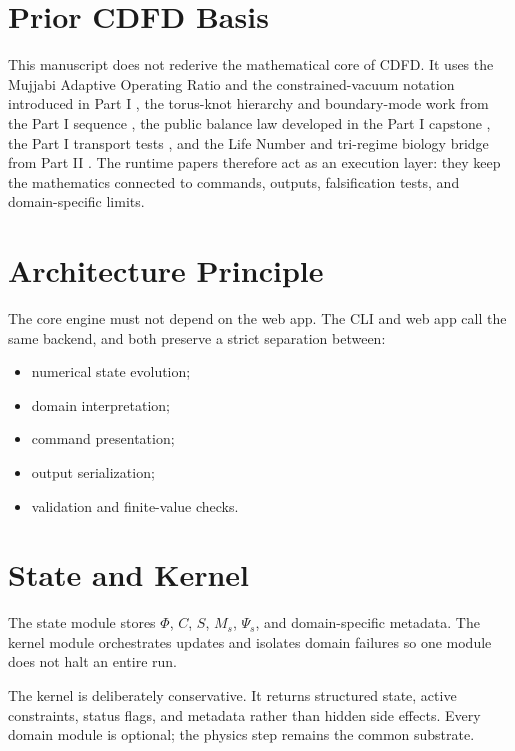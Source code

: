 \documentclass[12pt,a4paper]{article}
\begin{document}
\section{Prior CDFD Basis}
This manuscript does not rederive the mathematical core of CDFD. It uses the
Mujjabi Adaptive Operating Ratio and the constrained-vacuum notation introduced
in Part I \cite{MujjabiI2026}, the torus-knot hierarchy and boundary-mode work
from the Part I sequence \cite{MujjabiVI2026,MujjabiIX2026}, the public balance
law developed in the Part I capstone \cite{MujjabiX2026}, the Part I transport
tests \cite{MujjabiXII2026}, and the Life Number and tri-regime biology bridge
from Part II \cite{MujjabiPartII2026}. The runtime papers therefore act as an
execution layer: they keep the mathematics connected to commands, outputs,
falsification tests, and domain-specific limits.


\section{Architecture Principle}
The core engine must not depend on the web app. The CLI and web app call
the same backend, and both preserve a strict separation between:
\begin{itemize}
    \item numerical state evolution;
    \item domain interpretation;
    \item command presentation;
    \item output serialization;
    \item validation and finite-value checks.
\end{itemize}

\section{State and Kernel}
The state module stores $\Phi$, $C$, $S$, $M_s$, $\Psi_s$, and domain-specific
metadata. The kernel module orchestrates updates and isolates domain failures
so one module does not halt an entire run.

The kernel is deliberately conservative. It returns structured state, active
constraints, status flags, and metadata rather than hidden side effects.
Every domain module is optional; the physics step remains the common substrate.
\end{document}
